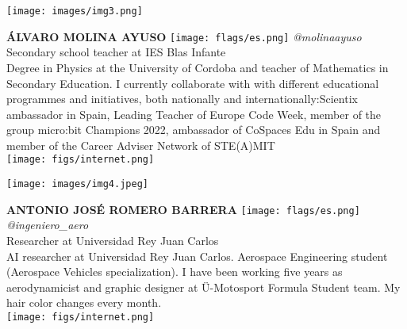 \noindent
\begin{minipage}{0.3\textwidth}
\centering
\texttt{[image: images/img3.png]}
\end{minipage}
\hfill
\begin{minipage}{0.6\textwidth}\raggedright
\color{color1}\uppercase{\textbf{Álvaro Molina Ayuso}}
\color{color2}\hspace{0.2cm}\texttt{[image: flags/es.png]}
\hspace{0.2cm}\textit{@molinaayuso}
\\
Secondary school teacher at IES Blas Infante\\
{\footnotesize Degree in Physics at the University of Cordoba and teacher of Mathematics in Secondary Education. I currently collaborate with with different educational programmes and initiatives, both nationally and internationally:Scientix ambassador in Spain, Leading Teacher of Europe Code Week, member of the group micro:bit Champions 2022, ambassador of CoSpaces Edu in Spain and member of the Career Adviser Network of STE(A)MIT}\\
\texttt{[image: figs/internet.png]}
\end{minipage}
\newline\newline\newline

\noindent
\begin{minipage}{0.3\textwidth}
\centering
\texttt{[image: images/img4.jpeg]}
\end{minipage}
\hfill
\begin{minipage}{0.6\textwidth}\raggedright
\color{color1}\uppercase{\textbf{Antonio José Romero Barrera}}
\color{color2}\hspace{0.2cm}\texttt{[image: flags/es.png]}
\hspace{0.2cm}\textit{@ingeniero\_aero}
\\
Researcher at Universidad Rey Juan Carlos\\
{\footnotesize AI researcher at Universidad Rey Juan Carlos. Aerospace Engineering student (Aerospace Vehicles specialization). I have been working five years as aerodynamicist and graphic designer at Ü-Motosport Formula Student team. My hair color changes every month.}\\
\texttt{[image: figs/internet.png]}
\end{minipage}
\newline\newline\newline

